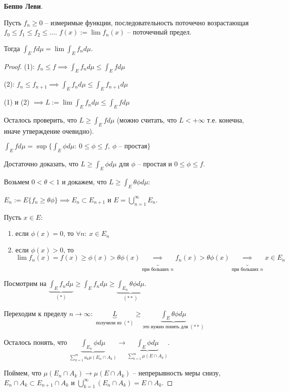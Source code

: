 \begin{theorem}
    \textbf{Беппо Леви}.

    Пусть $f_n \geq 0$ -- измеримые функции, последовательность поточечно возрастающая $f_0 \leq f_1 \leq f_2 \leq \dots$. $f(x) := \lim{f_n(x)}$ -- поточечный предел.

    Тогда $\int_E {f d \mu} = \lim{\int_E {f_n d \mu}}$.
\end{theorem}
\begin{proof}
    (1): $f_n \leq f \implies \int_E {f_n d \mu} \leq \int_E{f d \mu}$

    (2): $f_n \leq f_{n+1} \implies \int_E{f_n d \mu} \leq \int_E{f_{n+1} d \mu}$

    (1) и (2) $\implies L := \lim{\int_E{f_n d \mu}} \leq \int_E{f d \mu}$

    Осталось проверить, что $L \geq \int_E{f d \mu}$ (можно считать, что $L < +\infty$ т.е. конечна, иначе утверждение очевидно).

    $\int_E {f d \mu} = \sup \{ \int_E {\phi d \mu}: \ 0 \leq \phi \leq f, \ \phi \text{ -- простая} \}$
    
    Достаточно доказать, что $L \geq \int_E{\phi d \mu}$ для $\phi$ -- простая и $0 \leq \phi \leq f$.

    Возьмем $0 < \theta < 1$ и докажем, что $L \geq \int_E {\theta \phi d \mu}$:

    $E_n := E \{ f_n \geq \theta \phi \} \implies E_n \subset E_{n+1}$ и $E = \bigcup_{n=1}^{\infty} E_n$.

    Пусть $x \in E$:
    
    \begin{enumerate}
        \item если $\phi(x) = 0$, то $\forall n : \ x \in E_n$
        \item если $\phi(x) > 0$, то $\lim{f_n(x)} = f(x) \geq \phi(x) > \theta \phi(x) \underbrace{\implies}_{\text{при больших }n} f_n(x) > \theta \phi(x) \underbrace{\implies}_{\text{при больших }n} x \in E_n$
    \end{enumerate}


    Посмотрим на $\underbrace{\int_E{f_n d \mu}}_{(*)} \geq \int_E{f_n d \mu} \geq \underbrace{\int_{E_n}{\theta \phi d \mu}}_{(**)}$.

    Переходим к пределу $n \rightarrow \infty: $ $\underbrace{L}_{\text{получили из }(*)} \geq \underbrace{\int_E {\theta \phi d \mu}}_{\text{это нужно понять для }(**)}$

    Осталось понять, что $\underbrace{\int_{E_n} {\phi d \mu}}_{\sum_{k=1}^{m} a_k \mu (E_n \cap A_k)} \rightarrow \underbrace{\int_E {\phi d \mu}}_{\sum_{k=1}^{m} \mu (E \cap A_k)}$.

    Поймем, что $\mu (E_n \cap A_k) \rightarrow \mu (E \cap A_k)$ -- непрерывность меры снизу, $E_n \cap A_k \subset E_{n+1} \cap A_k$ и $\bigcup_{k=1}^{\infty} (E_n \cap A_k) = E \cap A_k$.
\end{proof}

